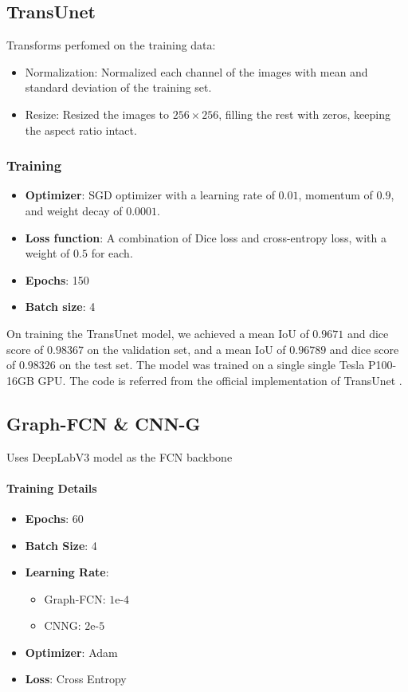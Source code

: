 \subsection{TransUnet}
Transforms perfomed on the training data:
\begin{itemize}
    \item Normalization: Normalized each channel of the images with mean and standard deviation of the training set.
    \item Resize: Resized the images to $256 \times 256$, filling the rest with zeros, keeping the aspect ratio intact.
\end{itemize}

\subsubsection*{Training}
\begin{itemize}
    \item \textbf{Optimizer}: SGD optimizer with a learning rate of $0.01$, momentum of $0.9$, and weight decay of $0.0001$.
    \item \textbf{Loss function}: A combination of Dice loss and cross-entropy loss, with a weight of $0.5$ for each.
    \item \textbf{Epochs}: 150
    \item \textbf{Batch size}: 4
\end{itemize}
On training the TransUnet model, we achieved a mean IoU of $0.9671$ and dice score of $0.98367$ on the validation set, and a mean IoU of $0.96789$ and dice score of $0.98326$ on the test set.
The model was trained on a single single Tesla P100-16GB GPU.
The code is referred from the official implementation of TransUnet \cite{transunet_github}.
\subsection{Graph-FCN \& CNN-G}

Uses DeepLabV3 \cite{deeplabv3} model as the FCN backbone

\paragraph{Training Details}
\begin{itemize}
    \item \textbf{Epochs}: 60
    \item \textbf{Batch Size}: 4
    \item \textbf{Learning Rate}:
    \begin{itemize}
        \item Graph-FCN: $1\text{e-}4$
        \item CNNG: $2\text{e-}5$
    \end{itemize}
    \item \textbf{Optimizer}: Adam
    \item \textbf{Loss}: Cross Entropy
\end{itemize}
